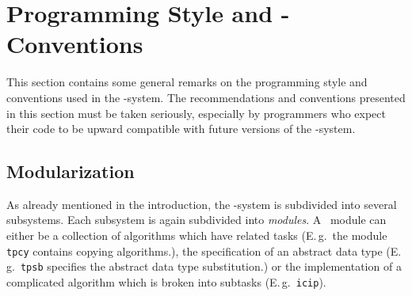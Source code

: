 \section{Programming Style and - Conventions}

This  section contains some general remarks on the programming style and 
conventions used in the \redux-system.
The recommendations and conventions presented in this section must be taken
seriously, especially by programmers who expect their code to be upward
compatible with future versions of the \redux-system.

\subsection{Modularization}

As already mentioned in the introduction, the \redux-system is subdivided
into several subsystems.
Each subsystem is again subdivided into {\em modules}.
A \redux\ module can either be a collection of algorithms which have related
tasks (E.\,g.\ the module {\tt tpcy} contains copying algorithms.),
the specification of an abstract data type (E.\,g.\ {\tt tpsb} specifies the
abstract data type substitution.) or the implementation of a complicated
algorithm which is broken into subtasks (E.\,g.\ {\tt icip}).

